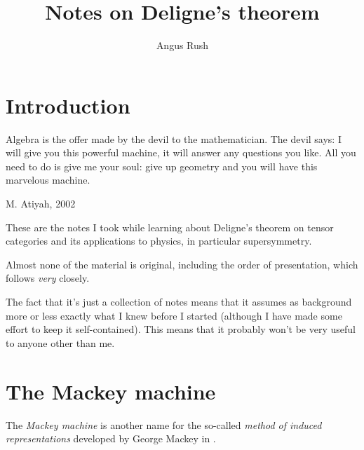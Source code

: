 \documentclass[a4paper]{report}
\title{Notes on Deligne's theorem}
\author{Angus Rush}
\theoremstyle{definition}
\theoremstyle{plain}
\theoremstyle{remark}
\begin{document}
 
\maketitle
\tableofcontents 

\chapter{Introduction}
\epigraph{Algebra is the offer made by the devil to the mathematician. The devil says: I will give you this powerful machine, it will answer any questions you like. All you need to do is give me your soul: give up geometry and you will have this marvelous machine.}{M. Atiyah, 2002}

These are the notes I took while learning about Deligne's theorem on tensor categories and its applications to physics, in particular supersymmetry. 

Almost none of the material is original, including the order of presentation, which follows \cite{nlab-deligne-theorem} \emph{very} closely.

The fact that it's just a collection of notes means that it assumes as background more or less exactly what I knew before I started (although I have made some effort to keep it self-contained). This means that it probably won't be very useful to anyone other than me.

\chapter{The Mackey machine}
The \emph{Mackey machine} is another name for the so-called \emph{method of induced representations} developed by George Mackey in \cite{mackey-induced-representations}. 
\end{document}
